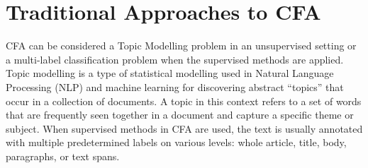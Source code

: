 \section{Traditional Approaches to CFA}

CFA can be considered a Topic Modelling problem in an unsupervised setting or a multi-label classification problem when the supervised methods are applied.
Topic modelling is a type of statistical modelling used in Natural Language Processing (NLP) and machine learning for discovering abstract ``topics'' that occur in a collection of documents.
A topic in this context refers to a set of words that are frequently seen together in a document and capture a specific theme or subject.
When supervised methods in CFA are used, the text is usually annotated with multiple predetermined labels on various levels: whole article, title, body, paragraphs, or text spans.

